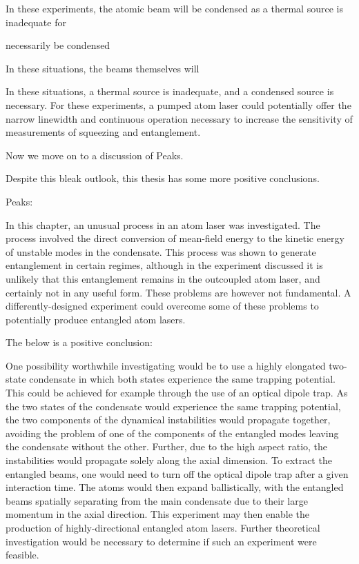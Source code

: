 In these experiments, the atomic beam will be condensed as a thermal source is inadequate for 

 necessarily be condensed


In these situations, the beams themselves will 


In these situations, a thermal source is inadequate, and a condensed source is necessary.  For these experiments, a pumped atom laser could potentially offer the narrow linewidth and continuous operation necessary to increase the sensitivity of measurements of squeezing and entanglement.  


Now we move on to a discussion of Peaks.

Despite this bleak outlook, this thesis has some more positive conclusions.  

Peaks:

In this chapter, an unusual process in an atom laser was investigated.  The process involved the direct conversion of mean-field energy to the kinetic energy of unstable modes in the condensate.  This process was shown to generate entanglement in certain regimes, although in the experiment discussed it is unlikely that this entanglement remains in the outcoupled atom laser, and certainly not in any useful form.  These problems are however not fundamental.  A differently-designed experiment could overcome some of these problems to potentially produce entangled atom lasers.

The below is a positive conclusion:

One possibility worthwhile investigating would be to use a highly elongated two-state condensate in which both states experience the same trapping potential.  This could be achieved for example through the use of an optical dipole trap.  As the two states of the condensate would experience the same trapping potential, the two components of the dynamical instabilities would propagate together, avoiding the problem of one of the components of the entangled modes leaving the condensate without the other.  Further, due to the high aspect ratio, the instabilities would propagate solely along the axial dimension.  To extract the entangled beams, one would need to turn off the optical dipole trap after a given interaction time.  The atoms would then expand ballistically, with the entangled beams spatially separating from the main condensate due to their large momentum in the axial direction.  This experiment may then enable the production of highly-directional entangled atom lasers.  Further theoretical investigation would be necessary to determine if such an experiment were feasible.


